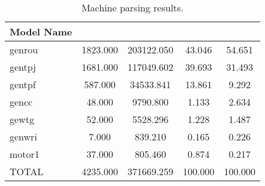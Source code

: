 \begin{table}[!ht]
	\centering
	\begin{tabular}{@{} C{2cm} 
	S[table-format=4.2,round-mode=places, round-precision=2,] 
	S[table-format=6.2,round-mode=places, round-precision=2] 
	S[table-format=3.2,round-mode=places, round-precision=2]
 	S[table-format=3.2,round-mode=places, round-precision=2] @{}} 	
		\toprule %
		\footnotesize %
		\raggedright %
Model Name & 	  & 	  & 			&		\\ \midrule
genrou & 	1823.000 & 	203122.050 & 	43.046 & 	54.651 \\
gentpj & 	1681.000 & 	117049.602 & 	39.693 & 	31.493 \\
gentpf & 	587.000 & 	34533.841 & 	13.861 & 	9.292 \\
gencc & 	48.000 & 	9790.800 & 	1.133 & 	2.634 \\
gewtg & 	52.000 & 	5528.296 & 	1.228 & 	1.487 \\
genwri & 	7.000 & 	839.210 & 	0.165 & 	0.226 \\
motor1 & 	37.000 & 	805.460 & 	0.874 & 	0.217 \\\midrule
TOTAL & 	4235.000 & 	371669.259 & 	100.000 & 	100.000 \\
		\bottomrule
	\end{tabular}
	\caption{Machine parsing results.}
	\label{tab: dydParse Machines }
\end{table}